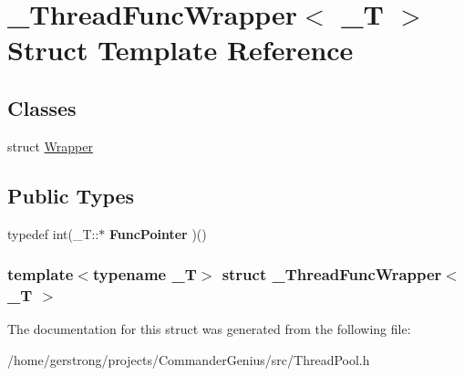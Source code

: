 \hypertarget{struct___thread_func_wrapper}{
\section{\_\-ThreadFuncWrapper$<$ \_\-T $>$ Struct Template Reference}
\label{struct___thread_func_wrapper}
}
\subsection*{Classes}
\begin{DoxyCompactItemize}
\item 
struct \hyperlink{struct___thread_func_wrapper_1_1_wrapper}{Wrapper}
\end{DoxyCompactItemize}
\subsection*{Public Types}
\begin{DoxyCompactItemize}
\item 
\hypertarget{struct___thread_func_wrapper_a94a34b5bbceed6ab7be1bf0f0d5d9596}{
typedef int(\_\-T::$\ast$ {\bfseries FuncPointer} )()}
\label{struct___thread_func_wrapper_a94a34b5bbceed6ab7be1bf0f0d5d9596}

\end{DoxyCompactItemize}
\subsubsection*{template$<$typename \_\-T$>$ struct \_\-ThreadFuncWrapper$<$ \_\-T $>$}



The documentation for this struct was generated from the following file:\begin{DoxyCompactItemize}
\item 
/home/gerstrong/projects/CommanderGenius/src/ThreadPool.h\end{DoxyCompactItemize}
